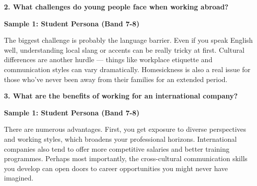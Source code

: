 \begin{ieltsquestion}
\textbf{2. What challenges do young people face when working abroad?}
\end{ieltsquestion}
\textbf{Sample 1: Student Persona (Band 7-8)}

The biggest challenge is probably the language barrier. Even if you speak English well, understanding local slang or accents can be really tricky at first. Cultural differences are another hurdle — things like workplace etiquette and communication styles can vary dramatically. Homesickness is also a real issue for those who've never been away from their families for an extended period.

\separator

\begin{ieltsquestion}
\textbf{3. What are the benefits of working for an international company?}
\end{ieltsquestion}
\textbf{Sample 1: Student Persona (Band 7-8)}

There are numerous advantages. First, you get exposure to diverse perspectives and working styles, which broadens your professional horizons. International companies also tend to offer more competitive salaries and better training programmes. Perhaps most importantly, the cross-cultural communication skills you develop can open doors to career opportunities you might never have imagined.

\separator


